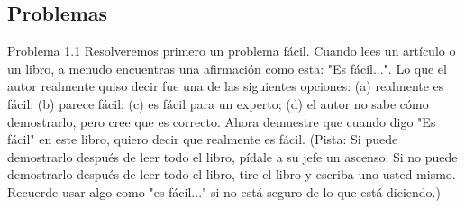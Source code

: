 \documentclass[11pt]{article}
\begin{document}
\subsection*{Problemas}
Problema 1.1 Resolveremos primero un problema fácil. Cuando lees un artículo o un libro, a menudo encuentras una afirmación como esta: "Es fácil...". Lo que el autor realmente quiso decir fue una de las siguientes opciones: (a) realmente es fácil; (b) parece fácil; (c) es fácil para un experto; (d) el autor no sabe cómo demostrarlo, pero cree que es correcto. Ahora demuestre que cuando digo "Es fácil" en este libro, quiero decir que realmente es fácil. (Pista: Si puede demostrarlo después de leer todo el libro, pídale a su jefe un ascenso. Si no puede demostrarlo después de leer todo el libro, tire el libro y escriba uno usted mismo. Recuerde usar algo como "es fácil..." si no está seguro de lo que está diciendo.)
\end{document}
